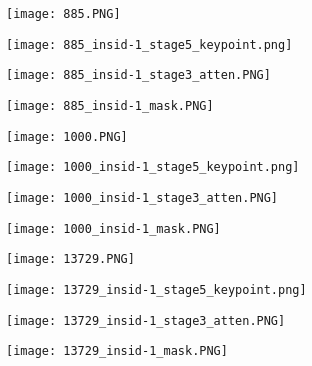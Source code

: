 \begin{figure}[htbp]
	\centering
	\begin{minipage}[t]{\linewidth}
		\centering
		\begin{minipage}[t]{0.23\linewidth}
			\texttt{[image: 885.PNG]}
		\end{minipage}
		\begin{minipage}[t]{0.23\linewidth}
			\texttt{[image: 885\_insid-1\_stage5\_keypoint.png]}
		\end{minipage}
		\begin{minipage}[t]{0.23\linewidth}
			\texttt{[image: 885\_insid-1\_stage3\_atten.PNG]}
		\end{minipage}
		\begin{minipage}[t]{0.23\linewidth}
			\texttt{[image: 885\_insid-1\_mask.PNG]}
		\end{minipage}
		
		\vskip5pt
		\begin{minipage}[t]{0.23\linewidth}
			\texttt{[image: 1000.PNG]}
		\end{minipage}
		\begin{minipage}[t]{0.23\linewidth}
			\texttt{[image: 1000\_insid-1\_stage5\_keypoint.png]}
		\end{minipage}
		\begin{minipage}[t]{0.23\linewidth}
			\texttt{[image: 1000\_insid-1\_stage3\_atten.PNG]}
		\end{minipage}
		\begin{minipage}[t]{0.23\linewidth}
			\texttt{[image: 1000\_insid-1\_mask.PNG]}
		\end{minipage}
		
		\vskip5pt
		\begin{minipage}[t]{0.23\linewidth}
			\texttt{[image: 13729.PNG]}
		\end{minipage}
		\begin{minipage}[t]{0.23\linewidth}
			\texttt{[image: 13729\_insid-1\_stage5\_keypoint.png]}
		\end{minipage}
		\begin{minipage}[t]{0.23\linewidth}
			\texttt{[image: 13729\_insid-1\_stage3\_atten.PNG]}
		\end{minipage}
		\begin{minipage}[t]{0.23\linewidth}
			\texttt{[image: 13729\_insid-1\_mask.PNG]}
		\end{minipage}
		

\end{minipage}
\end{figure}
